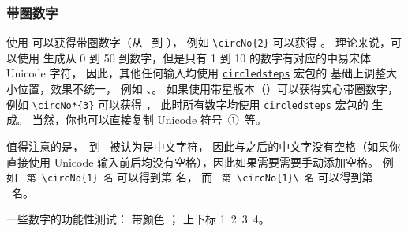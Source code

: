 \subsubsection{带圈数字}
使用 \texttt{\string\circNo} 可以获得带圈数字（从 \ 到 ），
例如 \verb|\circNo{2}| 可以获得 。
理论来说，可以使用 \texttt{\string\circNo} 生成从 0 到 50 到数字，但是只有 1 到 10 的数字有对应的中易宋体 Unicode 字符，
因此，其他任何输入均使用 \href{https://ctan.org/pkg/circledsteps}{\texttt{circledsteps}} 宏包的 \texttt{\string\CircleText} 基础上调整大小位置，效果不统一，
例如 、。
如果使用带星版本（\texttt{\string\circNo*}）可以获得实心带圈数字，
例如 \verb|\circNo*{3}| 可以获得 ，
此时所有数字均使用 \href{https://ctan.org/pkg/circledsteps}{\texttt{circledsteps}} 宏包的 \texttt{\string\Circle} 生成。
当然，你也可以直接复制 Unicode 符号\ ①\ 等。

值得注意的是，\ 到 \ 被认为是中文字符，
因此与之后的中文字没有空格（如果你直接使用 Unicode 输入前后均没有空格），因此如果需要需要手动添加空格。
例如 {\color{Blue}\ \verb|第 \circNo{1} 名|} 可以得到第  名，
而 {\color{Blue}\ \verb|第 \circNo{1}\ 名|} 可以得到第 \ 名。

一些数字的功能性测试：
带颜色 \textcolor{red}{     }；
上下标 1\textsuperscript{}\ 2\textsuperscript{}\ 3\textsubscript{}\ 4\textsubscript{}。
